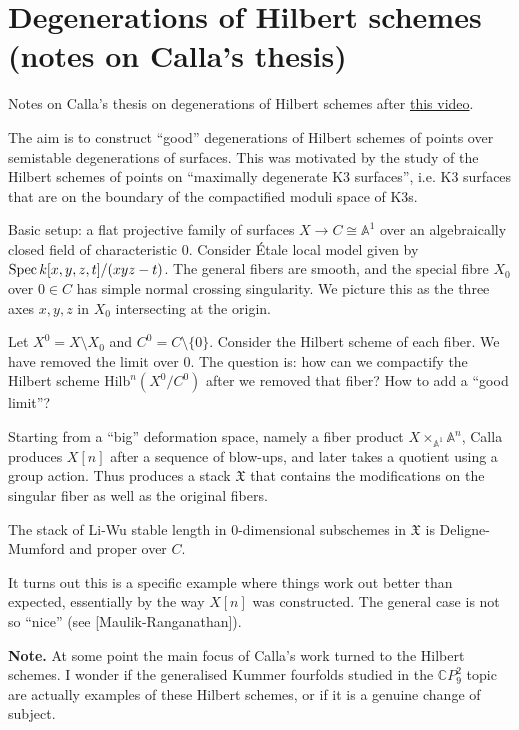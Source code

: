 \section{Degenerations of Hilbert schemes (notes on Calla's thesis)}
\label{section-degenerations-hilbert}

\noindent
Notes on Calla's thesis on
degenerations of Hilbert schemes after
\href{https://www.youtube.com/watch?v=Lf4NYTvnO9I&t=969s}
{this video}.

The aim is to construct ``good'' degenerations
of Hilbert schemes of points over semistable
degenerations of surfaces. This was motivated by
the study of the Hilbert schemes of points
on ``maximally degenerate K3 surfaces'',
i.e. K3 surfaces that are on the boundary of
the compactified moduli space of K3s.

Basic setup: a flat projective family
of surfaces $X \to C \cong \mathbb{A}^1$ over
an algebraically closed field of characteristic 0.
Consider Étale local model given by
$\mathop{\mathrm{Spec}} k[x,y,z,t]/(xyz-t)$.
The general fibers are smooth, and
the special fibre $X_0$ over $0 \in C$ 
has simple normal crossing singularity.
We picture this as the three axes $x,y,z$ in $X_0$ 
intersecting at the origin.

Let $X^0= X\setminus X_0$ and $C^0=C\setminus \{0\}$.
Consider the Hilbert scheme of each fiber.
We have removed the limit over 0.
The question is: how can we compactify the Hilbert scheme
$\text{Hilb}^n(X^0/C^0)$ after we removed that fiber?
How to add a ``good limit''?

Starting from a ``big'' deformation space,
namely a fiber product $X \times_{\mathbb{A}^1}\mathbb{A}^n$,
Calla produces $X[n]$ after a sequence of blow-ups,
and later takes a quotient using a group action.
Thus produces a stack $\mathfrak{X}$
that contains the modifications
on the singular fiber
as well as the original fibers.

\begin{theorem}[Calla]
\label{theorem-calla}
The stack of Li-Wu stable length in 0-dimensional
subschemes in $\mathfrak{X}$ is Deligne-Mumford
and proper over $C$.
\end{theorem}

\noindent
It turns out this is a specific example
where things work out better than expected,
essentially by the way $X[n]$ was constructed.
The general case is not so ``nice''
(see [Maulik-Ranganathan]).

\medskip\noindent
{\bf Note.} At some point the main focus
of Calla's work turned to the Hilbert schemes.
I wonder if the generalised Kummer fourfolds studied in the
$\mathbb{C}P^2_9$ topic are actually examples
of these Hilbert schemes, or if it is a genuine
change of subject.





